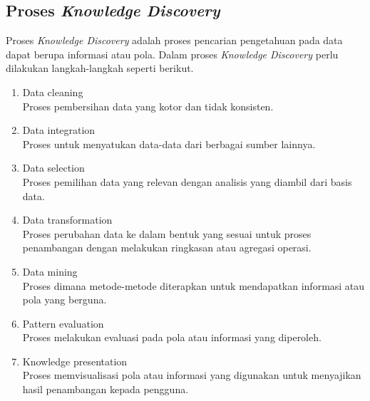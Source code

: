 \subsection{Proses \textit{Knowledge Discovery}}
Proses \textit{Knowledge Discovery} adalah proses pencarian pengetahuan pada data dapat berupa informasi atau pola. Dalam proses \textit{Knowledge Discovery} perlu dilakukan langkah-langkah seperti berikut.

\begin{enumerate}
	\item Data cleaning \\Proses pembersihan data yang kotor dan tidak konsisten.
	\item Data integration \\Proses untuk menyatukan data-data dari berbagai sumber lainnya.
	\item Data selection \\Proses pemilihan data yang relevan dengan analisis yang diambil dari basis data.
	\item Data transformation \\Proses perubahan data ke dalam bentuk yang sesuai untuk proses penambangan dengan melakukan ringkasan atau agregasi operasi.
	\item Data mining \\Proses dimana metode-metode diterapkan untuk mendapatkan informasi atau pola yang berguna.
	\item Pattern evaluation \\Proses melakukan evaluasi pada pola atau informasi yang diperoleh.
	\item Knowledge presentation \\Proses memvisualisasi pola atau informasi yang digunakan untuk menyajikan hasil penambangan kepada pengguna.
\end{enumerate}


